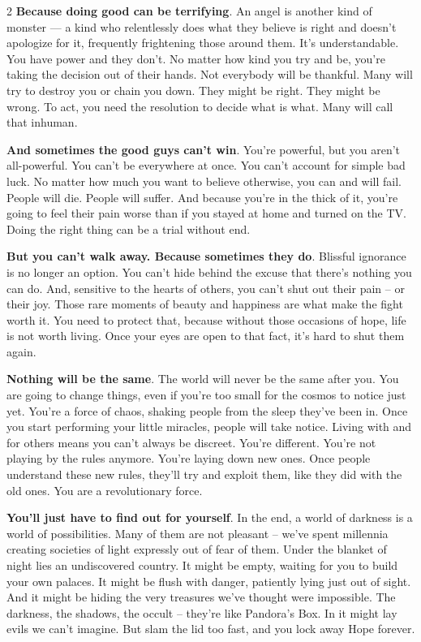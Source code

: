 \begin{multicols}{2}
\textbf{Because doing good can be terrifying}. An angel is another kind of monster — a kind who relentlessly does what they believe is right and doesn't apologize for it, frequently frightening those around them. It's understandable. You have power and they don't. No matter how kind you try and be, you're taking the decision out of their hands. Not everybody will be thankful. Many will try to destroy you or chain you down. They might be right. They might be wrong. To act, you need the resolution to decide what is what. Many will call that inhuman.

\textbf{And sometimes the good guys can't win}. You're powerful, but you aren't all-powerful. You can't be everywhere at once. You can't account for simple bad luck. No matter how much you want to believe otherwise, you can and will fail. People will die. People will suffer. And because you're in the thick of it, you're going to feel their pain worse than if you stayed at home and turned on the TV. Doing the right thing can be a trial without end.

\textbf{But you can't walk away. Because sometimes they do}. Blissful ignorance is no longer an option. You can't hide behind the excuse that there's nothing you can do. And, sensitive to the hearts of others, you can't shut out their pain -- or their joy. Those rare moments of beauty and happiness are what make the fight worth it. You need to protect that, because without those occasions of hope, life is not worth living. Once your eyes are open to that fact, it's hard to shut them again.

\textbf{Nothing will be the same}. The world will never be the same after you. You are going to change things, even if you're too small for the cosmos to notice just yet. You're a force of chaos, shaking people from the sleep they've been in. Once you start performing your little miracles, people will take notice. Living with and for others means you can't always be discreet. You're different. You're not playing by the rules anymore. You're laying down new ones. Once people understand these new rules, they'll try and exploit them, like they did with the old ones. You are a revolutionary force.

\textbf{You'll just have to find out for yourself}. In the end, a world of darkness is a world of possibilities. Many of them are not pleasant -- we've spent millennia creating societies of light expressly out of fear of them. Under the blanket of night lies an undiscovered country. It might be empty, waiting for you to build your own palaces. It might be flush with danger, patiently lying just out of sight. And it might be hiding the very treasures we've thought were impossible. The darkness, the shadows, the occult -- they're like Pandora's Box. In it might lay evils we can't imagine. But slam the lid too fast, and you lock away Hope forever.


\end{multicols}
